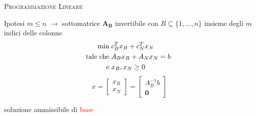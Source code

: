
\begin{frame}{\textsc{\LARGE Programmazione Lineare}}

Ipotesi $m \leq n$ \pause$\longrightarrow$ sottomatrice $\mathbf{A_{B}}$ invertibile con
$B\subseteq\{1,\dots,n\}$ insieme degli $m$ indici delle colonne 
\pause
\begin{equation*}
\begin{split}
\min\;&c_{B}^{T}x_{B}+c_{N}^{T}x_{N}\\
\text{tale che\;}&A_{B}x_{B}+A_{N}x_{N}= b\;\\\text{e\;}&x_{B},x_{N}\geq0
\end{split}
\end{equation*}
\pause
\begin{equation*}
x = \left[\begin{matrix}x_{B}\\x_{N}\end{matrix}\right] = \left[\begin{matrix}A_{B}^{-1}b\\\mathbf{0}\end{matrix}\right]
\end{equation*}
\begin{center}
	soluzione ammissibile di \textcolor{red}{base}
\end{center}
\end{frame}


